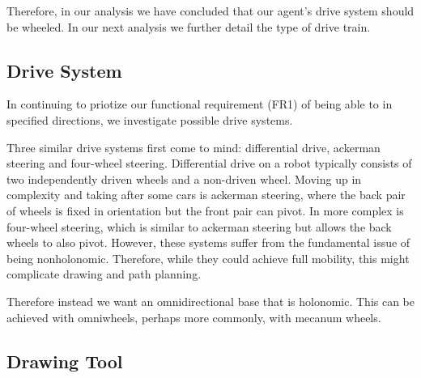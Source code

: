 Therefore, in our analysis we have concluded that our agent's drive system should be wheeled. In our next analysis we further detail the type of drive train. 

\subsection{Drive System}
In continuing to priotize our functional requirement (FR1) of being able to in specified directions, we investigate possible drive systems. 

Three similar drive systems first come to mind: differential drive, ackerman steering and four-wheel steering. Differential drive on a robot typically consists of two independently driven wheels and a non-driven wheel. Moving up in complexity and taking after some cars is ackerman steering, where the back pair of wheels is fixed in orientation but the front pair can pivot. In more complex is four-wheel steering, which is similar to ackerman steering but allows the back wheels to also pivot. However, these systems suffer from the fundamental issue of being nonholonomic. Therefore, while they could achieve full mobility, this might complicate drawing and path planning. 

Therefore instead we want an omnidirectional base that is holonomic. This can be achieved with omniwheels, perhaps more commonly, with mecanum wheels. 

\subsection{Drawing Tool}

